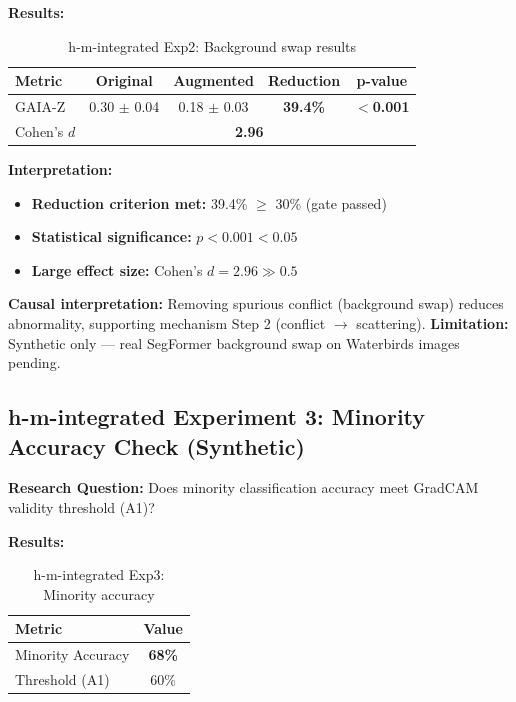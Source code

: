 \textbf{Results:}

\begin{table}[h]
\centering
\caption{h-m-integrated Exp2: Background swap results}
\label{tab:causality}
\begin{tabular}{lcccc}
\toprule
Metric & Original & Augmented & Reduction & p-value \\
\midrule
GAIA-Z & 0.30 $\pm$ 0.04 & 0.18 $\pm$ 0.03 & \textbf{39.4\%} & \textbf{$<$0.001} \\
Cohen's $d$ & \multicolumn{4}{c}{\textbf{2.96}} \\
\bottomrule
\end{tabular}
\end{table}

\textbf{Interpretation:}
\begin{itemize}
\item[$\checkmark$] \textbf{Reduction criterion met:} 39.4\% $\geq$ 30\% (gate passed)
\item[$\checkmark$] \textbf{Statistical significance:} $p<0.001 < 0.05$
\item[$\checkmark$] \textbf{Large effect size:} Cohen's $d=2.96 \gg 0.5$
\end{itemize}

\textbf{Causal interpretation:} Removing spurious conflict (background swap) reduces abnormality, supporting mechanism Step 2 (conflict $\rightarrow$ scattering). \textbf{Limitation:} Synthetic only --- real SegFormer background swap on Waterbirds images pending.

\subsection{h-m-integrated Experiment 3: Minority Accuracy Check (Synthetic)}

\textbf{Research Question:} Does minority classification accuracy meet GradCAM validity threshold (A1)?

\textbf{Results:}

\begin{table}[h]
\centering
\caption{h-m-integrated Exp3: Minority accuracy}
\label{tab:minority_acc}
\begin{tabular}{lc}
\toprule
Metric & Value \\
\midrule
Minority Accuracy & \textbf{68\%} \\
Threshold (A1) & 60\% \\
\bottomrule
\end{tabular}
\end{table}

